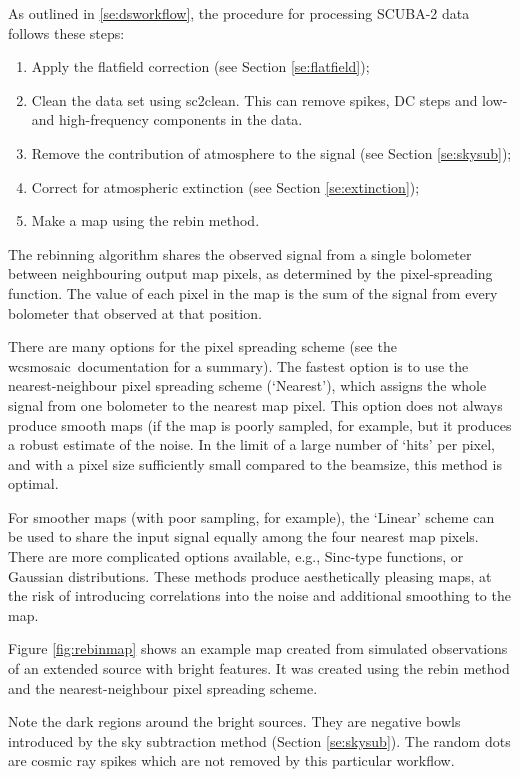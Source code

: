 \documentclass[twoside,11pt]{article}
\newcommand{\xref}[3]{#1}
\renewcommand{\_}{\texttt{\symbol{95}}}
\newcommand{\task}[1]{\textsf{#1}}
\newcommand{\clean}{\xref{\task{sc2clean}}{sun258}{SC2CLEAN}}
\newcommand{\wcsmosaic}{\xref{\task{wcsmosaic}}{sun95}{WCSMOSAIC}}
\begin{document}
As outlined in \ref{se:dsworkflow}, the procedure for processing
SCUBA-2 data follows these steps:
\begin{enumerate}
\item Apply the flatfield correction (see Section \ref{se:flatfield});
\item Clean the data set using \clean. This can remove spikes, DC
  steps and low- and high-frequency components in the data.
\item Remove the contribution of atmosphere to the signal (see Section
  \ref{se:skysub});
\item Correct for atmospheric extinction (see Section
  \ref{se:extinction});
\item Make a map using the rebin method.
\end{enumerate}

The rebinning algorithm shares the observed signal from a single
bolometer between neighbouring output map pixels, as determined by the
pixel-spreading function. The value of each pixel in the map is the
sum of the signal from every bolometer that observed at that position.

There are many options for the pixel spreading scheme (see the \wcsmosaic\
documentation for a summary). The fastest option is to use the nearest-neighbour
pixel spreading scheme (`Nearest'), which assigns the whole signal
from one bolometer to the nearest map pixel. This option does not
always produce smooth maps (if the map is poorly sampled, for example,
but it produces a robust estimate of the noise. In the limit of a
large number of `hits' per pixel, and with a pixel size sufficiently
small compared to the beamsize, this method is optimal.

For smoother maps (with poor sampling, for example), the `Linear'
scheme can be used to share the input signal equally among the four
nearest map pixels. There are more complicated options available,
e.g., Sinc-type functions, or Gaussian distributions. These methods
produce aesthetically pleasing maps, at the risk of introducing
correlations into the noise and additional smoothing to the map.

Figure \ref{fig:rebinmap} shows an example map created from simulated
observations of an extended source with bright features. It was
created using the rebin method and the nearest-neighbour pixel
spreading scheme.

Note the dark regions around the bright sources. They are negative
bowls introduced by the sky subtraction method (Section
\ref{se:skysub}). The random dots are cosmic ray spikes which are not
removed by this particular workflow.
\end{document}
